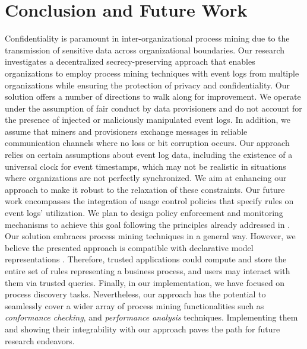 \section{Conclusion and Future Work}
\label{sec:conclusion}
Confidentiality is paramount in inter-organizational process mining due to the transmission of sensitive data across organizational boundaries. Our research investigates a decentralized secrecy-preserving approach that enables organizations to employ process mining techniques with event logs from multiple organizations while ensuring the protection of privacy and confidentiality. Our solution offers a number of directions %
to walk along for improvement. We operate under the assumption of fair conduct by data provisioners and do not account for the presence of injected or maliciously manipulated event logs. In addition, we assume that miners and provisioners exchange messages in reliable communication channels where no loss or bit corruption occurs. Our approach relies on certain assumptions about event log data, including the existence of a universal clock for event timestamps, which may not be realistic in situations where organizations are not perfectly synchronized. %
We aim at enhancing our approach to make it robust to the relaxation of these constraints.  Our future work encompasses the integration of usage control policies that specify rules on event logs' utilization. We plan to design policy enforcement and monitoring mechanisms to achieve this goal following the principles already addressed in \cite{basile2023blockchain,basile2023solid}. Our solution embraces process mining techniques in a general way. However, we believe the presented approach is compatible with declarative model representations \cite{di2022declarative}. Therefore, trusted applications could compute and store the entire set of rules representing a business process, and users may interact with them via trusted queries. Finally, in our implementation, we have focused on process discovery tasks. Nevertheless, our approach has the potential to seamlessly cover a wider array of process mining functionalities such as \textit{conformance checking}, and \textit{performance analysis} techniques. Implementing them and showing their integrability with our approach paves the path for future research endeavors.



